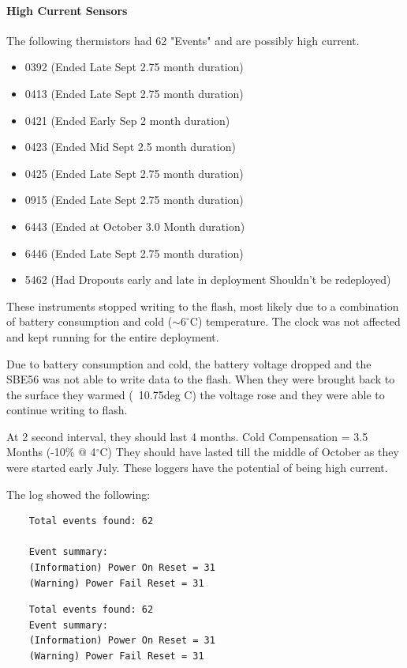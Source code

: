 \documentclass[10pt,letterpaper]{article}
\begin{document}
\paragraph{High Current Sensors}
The following thermistors had 62 "Events" and are possibly high current.
\begin{itemize}
    \item 0392 (Ended Late Sept 2.75 month duration)
    \item 0413 (Ended Late Sept 2.75 month duration)
    \item 0421 (Ended Early Sep 2 month duration)
    \item 0423 (Ended Mid Sept 2.5 month duration)
    \item 0425 (Ended Late Sept 2.75 month duration)
    \item 0915 (Ended Late Sept 2.75 month duration)
    \item 6443 (Ended at October 3.0 Month duration)
    \item 6446 (Ended Late Sept 2.75 month duration)
    \item 5462 (Had Dropouts early and late in deployment Shouldn't be redeployed)
\end{itemize}

These instruments stopped writing to the flash, most likely
due to a combination of battery consumption and cold ($\sim6^\circ$C)
temperature. The clock was not affected and kept running for the
entire deployment.

Due to battery consumption and cold, the battery voltage dropped and the
SBE56 was not able to write data to the flash.  When they were brought
back to the surface they warmed (~10.75deg C) the voltage rose and they
were able to continue writing to flash.

At 2 second interval, they should last 4 months.
Cold Compensation = 3.5 Months (-10\% @ 4$^{\circ}$C)
They should have lasted till the middle of October as they were started early July.
These loggers have the potential of being high current.

The log showed the following:
\begin{verbatim}
	Total events found: 62

	Event summary:
	(Information) Power On Reset = 31
	(Warning) Power Fail Reset = 31
\end{verbatim}


\begin{lstlisting}
	Total events found: 62
	Event summary:
	(Information) Power On Reset = 31
	(Warning) Power Fail Reset = 31
\end{lstlisting}
\end{document}
